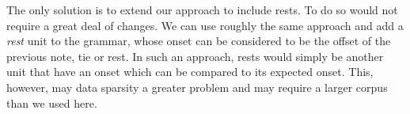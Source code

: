 The only solution is to extend our approach to include rests. To do so would not require a great deal of changes. We can use roughly the same approach and add a \textit{rest} unit to the grammar, whose onset can be considered to be the offset of the previous note, tie or rest. In such an approach, rests would simply be another unit that have an onset which can be compared to its expected onset. This, however, may data sparsity a greater problem and may require a larger corpus than we used here.

\begin{figure}
\centering
{}



\end{figure}
